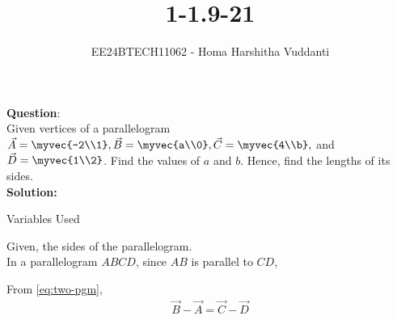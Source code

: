 \documentclass[journal]{IEEEtran}
\begin{document}

\vspace{3cm}

\title{1-1.9-21}
\author{EE24BTECH11062 - Homa Harshitha Vuddanti
}
{\let\newpage\relax\maketitle}

\renewcommand{\thefigure}{\theenumi}
\renewcommand{\thetable}{\theenumi}
\setlength{\intextsep}{10pt} %


\renewcommand{\thetable}{\theenumi}


\textbf{Question}:\\
Given vertices of a parallelogram $\vec{A}=\myvec{-2\\1}, \vec{B}=\myvec{a\\0}, \vec{C}=\myvec{4\\b},$ and $\vec{D}=\myvec{1\\2}$. Find the values of $a$ and $b$. Hence, find the lengths of its sides.
\\
\textbf{Solution: }\\
\begin{table}[h!]    
  \centering
  
  \caption{Variables Used}
  \label{1-1.9-21-table}
\end{table}
Given, the sides of the parallelogram.\\In a parallelogram $ABCD$, 
since $AB$ is parallel to $CD$,

From \eqref{eq:two-pgm},
\begin{align}
    \vec{B}-\vec{A}=\vec{C}-\vec{D}
\end{align}
\end{document}
